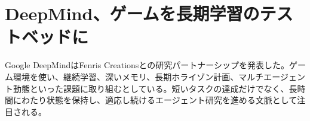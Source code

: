 \section{DeepMind、ゲームを長期学習のテストベッドに}
Google DeepMindはFenris Creationsとの研究パートナーシップを発表した。ゲーム環境を使い、継続学習、深いメモリ、長期ホライゾン計画、マルチエージェント動態といった課題に取り組むとしている。短いタスクの達成だけでなく、長時間にわたり状態を保持し、適応し続けるエージェント研究を進める文脈として注目される。
